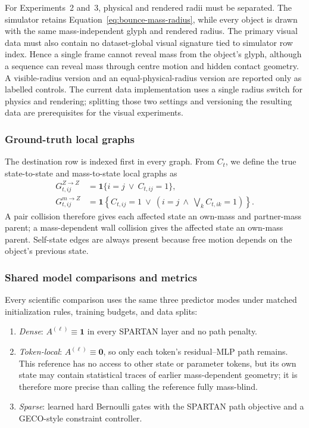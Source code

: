 For Experiments~2 and~3, physical and rendered radii must be separated.  The simulator retains
Equation~\eqref{eq:bounce-mass-radius}, while every object is drawn with the same
mass-independent glyph and rendered radius.  The primary visual data must also contain no
dataset-global visual signature tied to simulator row index.  Hence a single frame cannot reveal
mass from the object's glyph, although a sequence can reveal mass through centre motion and
hidden contact geometry.  A visible-radius version and an equal-physical-radius version are
reported only as labelled controls.  The current data implementation uses a single radius switch
for physics and rendering; splitting those two settings and versioning the resulting data are
prerequisites for the visual experiments.

\subsubsection{Ground-truth local graphs}
\label{sec:experiments:bounce:graphs}

The destination row is indexed first in every graph.  From $C_t$, we define the true
state-to-state and mass-to-state local graphs as
\begin{align}
    G^{Z\rightarrow Z}_{t,ij}
        &= \mathbf{1}\{i=j\ \lor\ C_{t,ij}=1\},
        \\
    G^{m\rightarrow Z}_{t,ij}
        &= \mathbf{1}\!\left\{C_{t,ij}=1\ \lor\
             \left(i=j\ \land\ \bigvee_k C_{t,ik}=1\right)\right\}.
    \label{eq:bounce-ground-truth-graphs}
\end{align}
A pair collision therefore gives each affected state an own-mass and partner-mass parent; a
mass-dependent wall collision gives the affected state an own-mass parent.  Self-state edges are
always present because free motion depends on the object's previous state.

\subsubsection{Shared model comparisons and metrics}
\label{sec:experiments:shared-protocol}

Every scientific comparison uses the same three predictor modes under matched initialization
rules, training budgets, and data splits:
\begin{enumerate}
    \item \emph{Dense}: $A^{(\ell)}\equiv\boldsymbol{1}$ in every SPARTAN layer and no
          path penalty.
    \item \emph{Token-local}: $A^{(\ell)}\equiv\boldsymbol{0}$, so only each token's
          residual--MLP path remains.  This reference has no access to other state or parameter
          tokens, but its own state may contain statistical traces of earlier mass-dependent
          geometry; it is therefore more precise than calling the reference fully mass-blind.
    \item \emph{Sparse}: learned hard Bernoulli gates with the SPARTAN path objective and a
          GECO-style constraint controller.
\end{enumerate}

